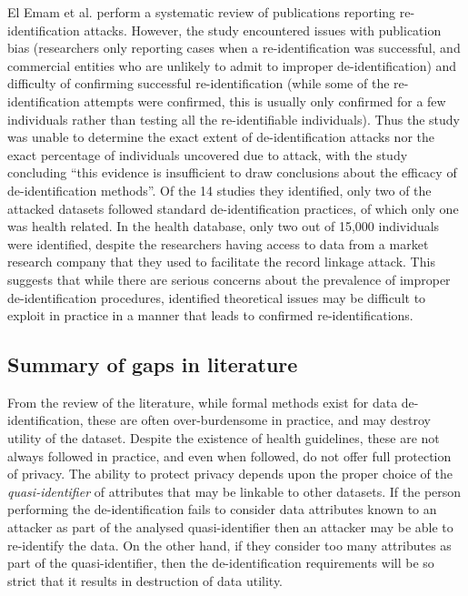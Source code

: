 El Emam et al. \cite{ElEmam2011} perform a systematic review of publications reporting re-identification attacks. However, the study encountered issues with publication bias (researchers only reporting cases when a re-identification was successful, and commercial entities who are unlikely to admit to improper de-identification) and difficulty of confirming successful re-identification (while some of the re-identification attempts were confirmed, this is usually only confirmed for a few individuals rather than testing all the re-identifiable individuals). Thus the study was unable to determine the exact extent of de-identification attacks nor the exact percentage of individuals uncovered due to attack, with the study concluding ``this evidence is insufficient to draw conclusions about the efficacy of de-identification methods''. Of the 14 studies they identified, only two of the attacked datasets followed standard de-identification practices, of which only one was health related. In the health database, only two out of 15,000 individuals were identified, despite the researchers having access to data from a market research company that they used to facilitate the record linkage attack. This suggests that while there are serious concerns about the prevalence of improper de-identification procedures, identified theoretical issues may be difficult to exploit in practice in a manner that leads to confirmed re-identifications.



\subsection{Summary of gaps in literature}

From the review of the literature, while formal methods exist for data de-identification, these are often over-burdensome in practice, and may destroy utility of the dataset. Despite the existence of health guidelines, these are not always followed in practice, and even when followed, do not offer full protection of privacy. The ability to protect privacy depends upon the proper choice of the \textit{quasi-identifier} of attributes that may be linkable to other datasets. If the person performing the de-identification fails to consider data attributes known to an attacker as part of the analysed quasi-identifier then an attacker may be able to re-identify the data. On the other hand, if they consider too many attributes as part of the quasi-identifier, then the de-identification requirements will be so strict that it results in destruction of data utility.

